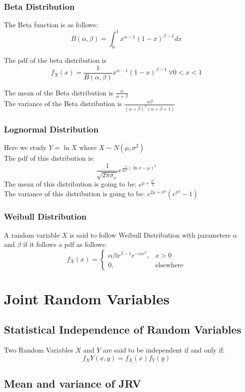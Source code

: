 \documentclass[11pt,letterpaper]{article}
\begin{document}
\subsubsection{Beta Distribution} 
The Beta function is as follows:
\[
  B(\alpha,\beta) = \int_0^1 x^{\alpha-1} (1-x)^{\beta-1} dx
\]

The pdf of the beta distribution is 
\[
  f_X(x) = \frac{1}{B(\alpha, \beta)} x^{\alpha-1} (1-x)^{\beta-1}\ \forall 
  0 < x < 1
\]

The mean of the Beta distribution is $ \frac{\alpha}{\alpha+\beta}$\\
The variance of the Beta distribution is $ \frac{\alpha\beta}{(\alpha+\beta)^2(\alpha + \beta + 1)}$
\subsubsection{Lognormal Distribution}
Here we study $ Y = \ln X $ where $ X \sim N(\mu, \sigma^2) $\\ 
The pdf of this distribution is: 
\[
  \frac{1}{\sqrt{2 \pi \sigma_x}} e^{\frac{-1}{2\sigma^2}\left( \ln x - \mu \right)^2}
\]
The mean of this distribution is going to be: $e^{\mu + \frac{\sigma^2}{2}}$\\
The variance of this distribution is going to be: $e^{2\mu + \sigma^2}(e^{\sigma^2} - 1)$
\subsubsection{Weibull Distribution}
A random variable $X$ is said to follow Weibull Distribution with parameters $\alpha$ and $\beta$ if it follows a pdf as follows:
\[
  f_X(x) = \begin{cases} \alpha\beta x^{\beta-1} e^{-\alpha x^\beta} ,& x>0 \\
  0 ,& \text{elsewhere}\end{cases}
\]
\section{Joint Random Variables}
\subsection{Statistical Independence of Random Variables}
Two Random Variables $X$ and $Y$ are said to be independent if and only if: 
\[
  f_XY(x,y) = f_X(x)f_Y(y)
\]
\subsection{Mean and variance of JRV}
\end{document}

